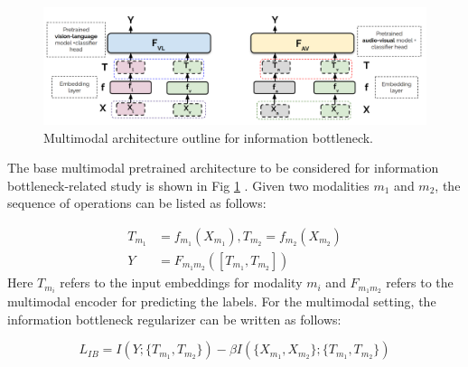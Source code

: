 \begin{figure}
     \centering
    \includegraphics[width=\textwidth]{figures/multimodal_IB.png}
    \caption{Multimodal architecture outline for information bottleneck.}
    \label{multimodal pretraining}
\end{figure}

The base multimodal pretrained architecture to be considered for information bottleneck-related study is shown in Fig \ref{multimodal pretraining} . Given two modalities $m_{1}$ and $m_{2}$, the sequence of operations can be listed as follows:

\begin{align}
    T_{m_{1}}&=f_{m_{1}}(X_{m_{1}}), T_{m_{2}}=f_{m_{2}}(X_{m_{2}})\\
    Y&=F_{m_{1}m_{2}}([T_{m_{1}},T_{m_{2}}])
\end{align}
Here $T_{m_{i}}$ refers to the input embeddings for modality $m_{i}$ and $F_{m_{1}m_{2}}$ refers to the multimodal encoder for predicting the labels. For the multimodal setting, the information bottleneck regularizer can be written as follows:

\begin{equation}
    L_{IB}= I(Y;\{T_{m_{1}},T_{m_{2}}\}) - \beta I(\{X_{m_{1}},X_{m_{2}}\};\{T_{m_{1}},T_{m_{2}}\})
\end{equation}

